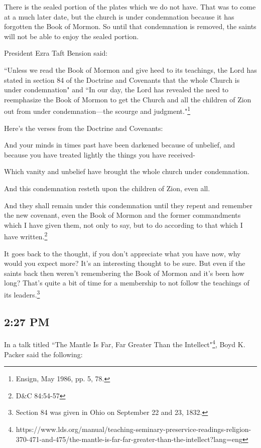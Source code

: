 There is the sealed portion of the plates which we do not have. That was to come at a
much later date, but the church is under condemnation because it has forgotten the
Book of Mormon. So until that condemnation is removed, the saints will not be able to
enjoy the sealed portion.

President Ezra Taft Bension said:

\begin{displayquote}
``Unless we read the Book of Mormon and give heed to its teachings, the Lord has stated 
in section 84 of the Doctrine and Covenants that the whole Church is under 
condemnation" and ``In our day, the Lord has revealed the need to reemphasize the 
Book of Mormon to get the Church and all the children of Zion out from under 
condemnation—the scourge and judgment."\footnote{Ensign, May 1986, pp. 5, 78.}
\end{displayquote}

Here's the verses from the Doctrine and Covenants:

\begin{displayquote}
And your minds in times past have been darkened because of unbelief, and because you 
have treated lightly the things you have received-

Which vanity and unbelief have brought the whole church under condemnation.

And this condemnation resteth upon the children of Zion, even all.

And they shall remain under this condemnation until they repent and remember the new 
covenant, even the Book of Mormon and the former commandments which I have given 
them, not only to say, but to do according to that which I have written.\footnote{
D\&C 84:54-57
}
\end{displayquote}

It goes back to the thought, if you don't appreciate what you have now, why would you
expect more? It's an interesting thought to be sure. But even if the saints back then
weren't remembering the Book of Mormon and it's been how long? That's quite a bit of
time for a membership to not follow the teachings of its leaders.\footnote{Section 84
was given in Ohio on September 22 and 23, 1832.} 

\subsection{2:27 PM}

In a talk titled ``The Mantle Is Far, Far Greater Than the Intellect"\footnote{
https://www.lds.org/manual/teaching-seminary-preservice-readings-religion-370-471-and-475/the-mantle-is-far-far-greater-than-the-intellect?lang=eng
}, Boyd K. Packer
said the following:

